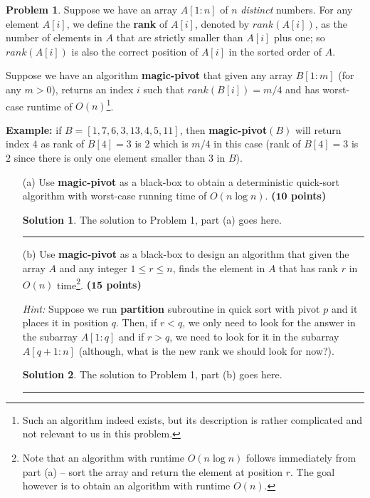 \documentclass{article}
\theoremstyle{definition}
\newtheorem{problem}{Problem}
\def\fline{\rule{0.75\linewidth}{0.5pt}}
\newcommand{\finishline}{\begin{center}\fline\end{center}}
\newtheorem*{solution*}{Solution}
\newenvironment{solution}{\begin{solution*}}{{\finishline} \end{solution*}}
\newcommand{\grade}[1]{\hfill{\textbf{($\mathbf{#1}$ points)}}}
\begin{document}
\begin{problem}
	Suppose we have an array $A[1:n]$ of $n$ \emph{distinct} numbers. For any element $A[i]$, we define the \textbf{rank} of $A[i]$, denoted by $rank(A[i])$, as the number of elements in $A$ that are strictly smaller than $A[i]$ plus one; so $rank(A[i])$ 
	is also the correct position of $A[i]$ in the sorted order of $A$. 
	
	Suppose we have an algorithm \textbf{magic-pivot} that given any array $B[1:m]$ (for any $m > 0$), returns an index $i$ such that $rank(B[i]) = m/4$ and has worst-case runtime of $O(n)$\footnote{Such an algorithm indeed
	exists, but its description is rather complicated and not relevant to us in this problem.}. 

	\textbf{Example:} if $B=[1,7,6,3,13,4,5,11]$, then \textbf{magic-pivot}$(B)$ will return index $4$ as rank of $B[4]=3$ is $2$ which is $m/4$ in this case (rank of $B[4]=3$ is $2$ since there is only one element smaller than $3$ in $B$). 
	
	\begin{enumerate}
	\item[(a)] Use \textbf{magic-pivot} as a black-box to obtain a {deterministic} quick-sort algorithm with worst-case running time of $O(n\log{n})$. \grade{10}
	
	\begin{solution}
		The solution to Problem 1, part (a) goes here. 
	\end{solution}
	
	
	\item[(b)] Use \textbf{magic-pivot} as a black-box to design an algorithm that given the array $A$ and any integer $1 \leq r \leq n$, finds the element in $A$ that has rank $r$ in $O(n)$ time\footnote{Note that an algorithm with runtime $O(n\log{n})$ follows immediately from part (a) -- sort the array and return the element at position $r$. The goal however is to obtain an algorithm with runtime $O(n)$.}. \grade{15}
	
	\emph{Hint:} Suppose we run \textbf{partition} subroutine in quick sort with pivot $p$ and it places it in position $q$. Then, if $r < q$, we only need to look for the answer in the subarray $A[1:q]$ and 
	if $r > q$, we need to look for it in the subarray $A[q+1:n]$ (although, what is the new rank we should look for now?). 
	
	\begin{solution}
	
		The solution to Problem 1, part (b) goes here. 
	\end{solution}
	
	
	\end{enumerate}
	
\end{problem}
\end{document}

